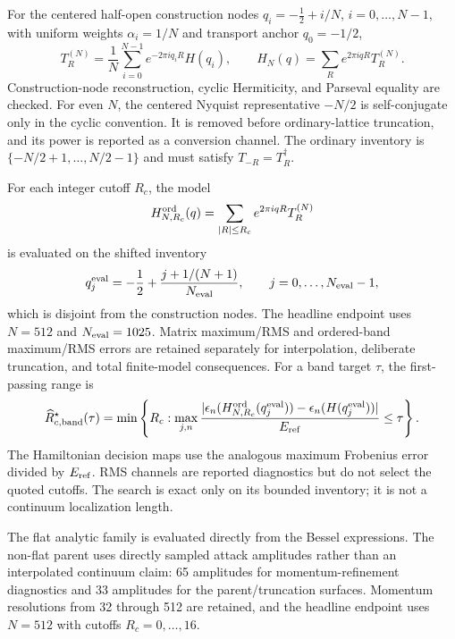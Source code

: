 \documentclass[11pt]{article}
\theoremstyle{definition}
\begin{document}
For the centered half-open construction nodes
$q_i=-\tfrac12+i/N$, $i=0,\ldots,N-1$, with uniform weights
$\alpha_i=1/N$ and transport anchor $q_0=-1/2$,
\begin{equation}
 T_R^{(N)}=\frac{1}{N}\sum_{i=0}^{N-1}e^{-2\pi iq_iR}H(q_i),
 \qquad H_N(q)=\sum_R e^{2\pi iqR}T_R^{(N)}.
 \label{eq:rank2-finite-fourier}
\end{equation}
Construction-node reconstruction, cyclic Hermiticity, and Parseval equality are checked.
For even $N$, the centered Nyquist representative $-N/2$ is self-conjugate only in the
cyclic convention.  It is removed before ordinary-lattice truncation, and its power is
reported as a conversion channel.  The ordinary inventory is
$\{-N/2+1,\ldots,N/2-1\}$ and must satisfy $T_{-R}=T_R^\dagger$.

For each integer cutoff $R_c$, the model
\begin{equation}
 H_{N,R_c}^{\rm ord}(q)=\sum_{|R|\le R_c}e^{2\pi iqR}T_R^{(N)}
 \label{eq:rank2-truncated-field}
\end{equation}
is evaluated on the shifted inventory
\begin{equation}
 q_j^{\rm eval}=-\frac12+\frac{j+1/(N+1)}{N_{\rm eval}},
 \qquad j=0,\ldots,N_{\rm eval}-1,
\end{equation}
which is disjoint from the construction nodes.  The headline endpoint uses $N=512$ and
$N_{\rm eval}=1025$.  Matrix maximum/RMS and ordered-band maximum/RMS errors are retained
separately for interpolation, deliberate truncation, and total finite-model
consequences.  For a band target $\tau$, the first-passing range is
\begin{equation}
 \widehat R_{c,{\rm band}}^\star(\tau)=
 \min\left\{R_c:\max_{j,n}
 \frac{|\epsilon_n(H_{N,R_c}^{\rm ord}(q_j^{\rm eval}))-
 \epsilon_n(H(q_j^{\rm eval}))|}{E_{\rm ref}}\le\tau\right\}.
\end{equation}
The Hamiltonian decision maps use the analogous maximum Frobenius error divided by
$E_{\rm ref}$.  RMS channels are reported diagnostics but do not select the quoted
cutoffs.  The search is exact only on its bounded inventory; it is not a continuum
localization length.

The flat analytic family is evaluated directly from the Bessel expressions.  The
non-flat parent uses directly sampled attack amplitudes rather than an interpolated
continuum claim: 65 amplitudes for momentum-refinement diagnostics and 33 amplitudes for
the parent/truncation surfaces.  Momentum resolutions from 32 through 512 are retained,
and the headline endpoint uses $N=512$ with cutoffs $R_c=0,\ldots,16$.
\end{document}
